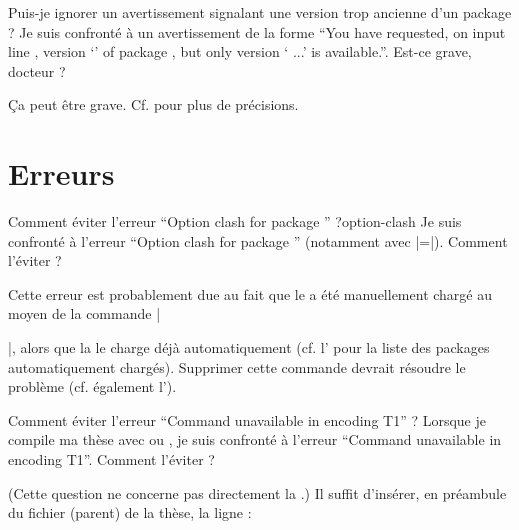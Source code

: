\begin{dbfaq}{Puis-je ignorer un avertissement signalant une version trop
    ancienne d'un package ?}{}
  Je suis confronté à un avertissement de la forme \enquote{You have requested,
    on input line , version `' of package
    , but only version ` ...'
    is available.}. Est-ce grave, docteur ?
\end{dbfaq}

Ça peut être grave. Cf.  pour plus de précisions.

\section{Erreurs}
\label{sec-erreurs}%
%
%

\begin{dbfaq}{Comment éviter l'erreur \enquote{Option clash for package
      } ?}{option-clash}
  Je suis confronté à l'erreur \enquote{Option clash for package }
  (notamment avec |=|). Comment l'éviter ?
\end{dbfaq}

Cette erreur est probablement due au fait que le  a été
manuellement chargé au moyen de la commande
|\usepackage[...]{|\meta{package}|}|, alors que la \yatCl{} le charge déjà
automatiquement (cf. l' pour la liste des
packages automatiquement chargés). Supprimer cette commande devrait résoudre le
problème (cf. également l').

\begin{dbfaq}{Comment éviter l'erreur \enquote{Command
      \protect{} unavailable in encoding T1} ?}{}
  Lorsque je compile ma thèse avec  ou , je
  suis confronté à l'erreur \enquote{Command 
    unavailable in encoding T1}. Comment l'éviter ?
\end{dbfaq}

(Cette question ne concerne pas directement la \yatCl{}.) Il suffit
d'insérer, en préambule du fichier (parent) de la thèse, la ligne :
\begin{preamblecode}[title=Par exemple dans le \File{\configurationfile}]
\end{preamblecode}

